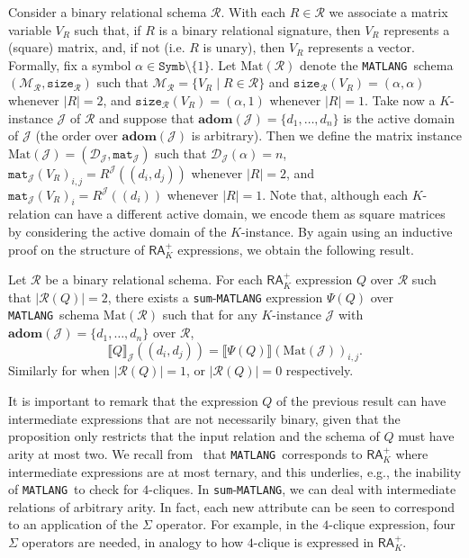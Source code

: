 \documentclass[sigconf]{acmart}
\newcommand{\sem}[2]{\llbracket #1 \rrbracket(#2)}
\newcommand{\Mnam}{\mathcal{M}}
\newcommand{\dom}{\mathcal{D}}
\newcommand{\conc}{\texttt{mat}}
\newcommand{\DD}{\texttt{Symb}}
\newcommand{\size}{\texttt{size}}
\newcommand{\lang}{\texttt{MATLANG}\xspace}
\newcommand{\langsum}{\texttt{sum}-\texttt{MATLANG}\xspace}
\newcommand{\cJ}{\mathcal{J}}
\newcommand{\cR}{\mathcal{R}}
\newcommand{\adom}{\mathbf{adom}}
\newcommand{\arae}{Q}
\newcommand{\ssem}[2]{\llbracket #1 \rrbracket_{#2}}
\begin{document}
Consider a binary relational schema $\cR$. With each $R\in \cR$ we associate a matrix variable $V_R$ such that, if $R$ is a binary relational signature, then $V_R$ represents a (square) matrix, and, if not (i.e. $R$ is unary), then $V_R$ represents a vector. Formally, fix a symbol $\alpha \in \DD \setminus \{1\}$. Let $\text{Mat}(\cR)$ denote the \lang \ schema
$(\Mnam_\cR,\size_\cR)$ such that $\Mnam_\cR = \{ V_R \mid R \in \cR\}$ and $\size_\cR(V_R) = (\alpha, \alpha)$ whenever $|R| = 2$, and $\size_\cR(V_R) = (\alpha, 1)$ whenever $|R|=1$. 
Take now a $K$-instance $\cJ$ of $\cR$ and suppose that $\adom(\cJ) = \{d_1, \ldots, d_n\}$ is the active domain of $\cJ$ (the order over $\adom(\cJ)$ is arbitrary). Then we define the matrix instance $\text{Mat}(\cJ) = (\dom_\cJ,\conc_\cJ)$ such that $\dom_\cJ(\alpha) = n$, $\conc_\cJ(V_R)_{i,j} = R^{\cJ}((d_i, d_j))$ whenever $|R|=2$, and $\conc_\cJ(V_R)_{i} = R^{\cJ}((d_i))$ whenever $|R|=1$. 
Note that, although each $K$-relation can have a different active domain, we encode them as square matrices by considering the active domain of the $K$-instance. By again using an inductive proof on the structure of 
$\mathsf{RA}_{K}^+$ expressions, we obtain the following result.
\begin{proposition}\label{prop:ara_to_sum} 
	Let $\cR$ be a binary relational schema. For each $\mathsf{RA}_{K}^+$  expression $\arae$ over $\cR$  such that $|\cR(\arae)| = 2$, there exists a \langsum  expression $\Psi(\arae)$ over \lang \ schema $\text{Mat}(\cR)$ such that for any $K$-instance $\cJ$ with $\adom(\cJ) = \{d_1, \ldots, d_n\}$ over $\cR$,
	$$
	\ssem{\arae}{\cJ}((d_i, d_j))=\sem{\Psi(\arae)}{\text{Mat}(\cJ)}_{i,j}.
	$$
	Similarly for when $|\cR(\arae)| = 1$, or $|\cR(\arae)| = 0$ respectively.
\end{proposition} 

It is important to remark that the expression $\arae$ of the previous result can have intermediate expressions that are not necessarily binary, given that the proposition only restricts that the input relation and the schema of $\arae$ must have arity at most two. We recall from~\cite{brijder2019matrices} that \lang\ corresponds to $\mathsf{RA}_{K}^+$ where intermediate expressions are at most ternary, and this underlies, e.g., the inability of \lang\ to check for $4$-cliques. In \langsum, we can deal with intermediate relations of arbitrary arity. In fact, each new attribute can be seen to correspond to an application of the $\Sigma$ operator. For example, in the $4$-clique expression, four $\Sigma$ operators are needed, in analogy to how
$4$-clique is expressed in $\mathsf{RA}_{K}^+$.
\end{document}
